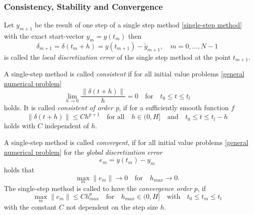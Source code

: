 	\subsubsection{Consistency, Stability and Convergence}
	\begin{frame}
		\begin{definition}\label{Discretization_Error_SingleStep}
			Let $y_{m+1}$ be the result of one step of a single step method \eqref{single-step method} with the exact start-vector $y_m = y(t_m)$ then
			\begin{equation}
				\label{local discretization error single step}
				\delta_{m+1} = \delta(t_m+h) = y(t_{m+1}) - \tilde{y}_{m+1}, \quad m = 0,...,N-1
			\end{equation}
			is called the \emph{local discretization error} of the single step method at the point $t_{m+1}$.
		\end{definition}
	\end{frame}
	
	\begin{frame}
		\begin{definition}\label{Consistency_SingleStep}
			A single-step method is called \emph{consistent} if for all initial value problems \eqref{general numerical problem} 
			\begin{equation}
				\lim\limits_{h \to 0} \frac{\|\delta(t+h)\|}{h} = 0 \quad \text{for} \quad t_0 \leq t \leq t_l
			\end{equation}
			holds.\newline
			It is called \emph{consistent of order p}, if for a sufficiently smooth function $f$
			\begin{equation}
				\|\delta(t+h)\| \leq Ch^{p+1} \quad \text{for all} \quad h \in \mathopen{(} 0,H \mathclose{]} \quad \text{and} \quad t_0 \leq t \leq t_l - h
			\end{equation}
			holds with $C$ independent of $h$.
		\end{definition}
	\end{frame}
	
	\begin{frame}
		\begin{definition}\label{Convergence_SingleStep}
			A single-step method is called \emph{convergent}, if for all initial value problems \eqref{general numerical problem} for the \emph{global discretization error}
			\begin{displaymath}
				e_m = y(t_m)-y_m
			\end{displaymath}
			holds that
			\begin{displaymath}
				\max\limits_{m}\|e_m\| \to 0 \quad \text{for} \quad h_{max} \to 0.
			\end{displaymath}
			The single-step method is called to have the \emph{convergence order} $p$, if
			\begin{displaymath}
				\max\limits_{m} \|e_m\| \leq C h_{max}^p \quad \text{for} \quad h_{max} \in \mathopen{(} 0,H \mathclose{]} \quad \text{with} \quad t_0 \leq t_m \leq t_l
			\end{displaymath}
			with the constant $C$ not dependent on the step size $h$.
		\end{definition}
	\end{frame}
	
